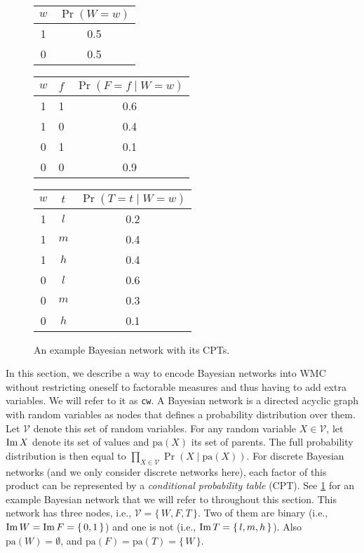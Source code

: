 \begin{figure}[t]
  \centering
    \\
    \begin{tabular}[t]{cc}
      \toprule
      $w$ & $\Pr(W = w)$ \\
      \midrule
      1 & 0.5 \\
      0 & 0.5 \\
      \bottomrule
    \end{tabular}
    \begin{tabular}[t]{ccc}
      \toprule
      $w$ & $f$ & $\Pr(F = f \mid W = w)$ \\
      \midrule
      1 & 1 & 0.6 \\
      1 & 0 & 0.4 \\
      0 & 1 & 0.1 \\
      0 & 0 & 0.9 \\
      \bottomrule
    \end{tabular}
    \begin{tabular}[t]{ccc}
      \toprule
      $w$ & $t$ & $\Pr(T = t \mid W = w)$ \\
      \midrule
      1 & $l$ & 0.2 \\
      1 & $m$ & 0.4 \\
      1 & $h$ & 0.4 \\
      0 & $l$ & 0.6 \\
      0 & $m$ & 0.3 \\
      0 & $h$ & 0.1 \\
      \bottomrule
    \end{tabular}
  \caption{An example Bayesian network with its CPTs.}\label{fig:example_bn}
\end{figure}

In this section, we describe a way to encode Bayesian networks into WMC without
restricting oneself to factorable measures and thus having to add extra
variables. We will refer to it as \texttt{cw}. A Bayesian network is a directed
acyclic graph with random variables as nodes that defines a probability
distribution over them. Let $\mathcal{V}$ denote this set of random variables.
For any random variable $X \in \mathcal{V}$, let $\operatorname{Im} X$ denote its set of
values and $\mathrm{pa}(X)$ its set of parents. The full probability
distribution is then equal to
$\prod_{X \in \mathcal{V}} \Pr(X \mid \mathrm{pa}(X))$. For discrete Bayesian
networks (and we only consider discrete networks here), each factor of this
product can be represented by a \emph{conditional probability table} (CPT). See
\cref{fig:example_bn} for an example Bayesian network that we will refer to
throughout this section. This network has three nodes, i.e.,
$\mathcal{V} = \{\, W, F, T \,\}$. Two of them are binary (i.e.,
$\operatorname{Im} W = \operatorname{Im} F = \{\, 0, 1 \,\}$) and one is not (i.e.,
$\operatorname{Im} T = \{\, l, m, h \,\}$). Also $\mathrm{pa}(W) = \emptyset$, and
$\mathrm{pa}(F) = \mathrm{pa}(T) = \{\, W \,\}$.

